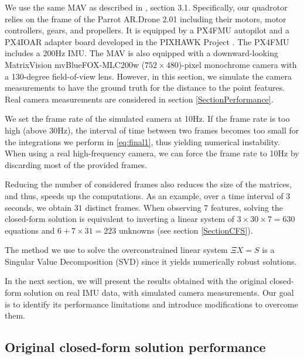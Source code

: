 \documentclass[letterpaper, 10 pt, conference]{ieeeconf}  %
\begin{document}
We use the same MAV as described in \cite{FaesslerICRA15}, section 3.1.
Specifically, our quadrotor relies on the frame of the Parrot AR.Drone 2.01 including their motors, motor controllers, gears, and propellers.
It is equipped by a PX4FMU autopilot and a PX4IOAR adapter board developed in the PIXHAWK Project \cite{meier2012pixhawk}.
The PX4FMU includes a 200Hz IMU.
The MAV is also equipped with a downward-looking MatrixVision mvBlueFOX-MLC200w ($752 \times 480$)-pixel monochrome camera with a 130-degree field-of-view lens.
However, in this section, we simulate the camera measurements to have the ground truth for the distance to the point features.
Real camera measurements are considered in section \ref{SectionPerformance}.

We set the frame rate of the simulated camera at 10Hz.
If the frame rate is too high (above 30Hz), the interval of time between two frames becomes too small for the integrations we perform in \ref{eq:final1}, thus yielding numerical instability.
When using a real high-frequency camera, we can force the frame rate to 10Hz by discarding most of the provided frames.

Reducing the number of considered frames also reduces the size of the matrices, and thus, speeds up the computations.
As an example, over a time interval of 3 seconds, we obtain $31$ distinct frames.
When observing 7 features, solving the closed-form solution is equivalent to inverting a linear system of $3\times 30\times 7 = 630$ equations and $6+7\times 31=223$ unknowns (see section \ref{SectionCFS}).

The method we use to solve the overconstrained linear system $\Xi X = S$ is a Singular Value Decomposition (SVD) since it yields numerically robust solutions.

In the next section, we will present the results obtained with the original closed-form solution on real IMU data, with simulated camera measurements.
Our goal is to identify its performance limitations and introduce modifications to overcome them.


\subsection{Original closed-form solution performance}
\end{document}
